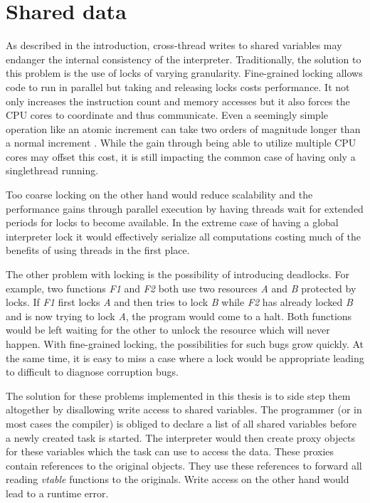 \documentclass[bachelor,english]{hgbthesis}
\begin{document}
\section{Shared data}

As described in the introduction, cross-thread writes to shared variables may endanger the internal consistency of the interpreter. Traditionally, the solution to this problem is the use of locks of varying granularity. Fine-grained locking allows code to run in parallel but taking and releasing locks costs performance. It not only increases the instruction count and memory accesses but it also forces the CPU cores to coordinate and thus communicate. Even a seemingly simple operation like an atomic increment can take two orders of magnitude longer than a normal increment \cite{LockingInOSKernels}. While the gain through being able to utilize multiple CPU cores may offset this cost, it is still impacting the common case of having only a singlethread running.

Too coarse locking on the other hand would reduce scalability and the performance gains through parallel execution by having threads wait for extended periods for locks to become available. In the extreme case of having a global interpreter lock it would effectively serialize all computations costing much of the benefits of using threads in the first place.

The other problem with locking is the possibility of introducing deadlocks. For example, two functions \textit{F1} and \textit{F2} both use two resources \textit{A} and \textit{B} protected by locks. If \textit{F1} first locks \textit{A} and then tries to lock \textit{B} while \textit{F2} has already locked \textit{B} and is now trying to lock \textit{A}, the program would come to a halt. Both functions would be left waiting for the other to unlock the resource which will never happen. With fine-grained locking, the possibilities for such bugs grow quickly. At the same time, it is easy to miss a case where a lock would be appropriate leading to difficult to diagnose corruption bugs.

The solution for these problems implemented in this thesis is to side step them altogether by disallowing write access to shared variables. The programmer (or in most cases the compiler) is obliged to declare a list of all shared variables before a newly created task is started. The interpreter would then create proxy objects for these variables which the task can use to access the data. These proxies contain references to the original objects. They use these references to forward all reading \textit{vtable} functions to the originals. Write access on the other hand would lead to a runtime error.
\end{document}
